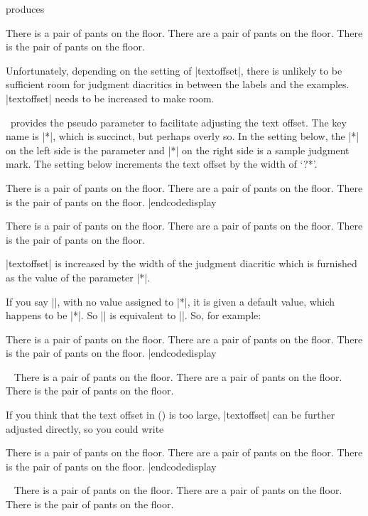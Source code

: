 \noindent produces

\framedisplay
\pex
\a There is a pair of pants on the floor.
\a {}There are a pair of pants on the floor.
\a \ljudge*There is the pair of pants on the floor.
\xe
\endframedisplay

\noindent Unfortunately, depending on the setting of
|textoffset|, there is unlikely to be sufficient room for
judgment diacritics in between the labels and the examples.
|textoffset| needs to be increased to make room.

\ExPex\ provides the pseudo parameter to facilitate adjusting the text
offset.  The key name is |*|, which is succinct, but perhaps overly
so.  In the setting below, the |*| on the left side is the parameter
and |*| on the right side is a sample judgment mark.  The setting
below increments the text offset by the width of `?*'.

\codedisplay
\pex[*=?*]
\a There is a pair of pants on the floor.
\a {}There are a pair of pants on the floor.
\a \ljudge*There is the pair of pants on the floor.
\xe |endcodedisplay

\framedisplay
\pex[*=?*]
\a There is a pair of pants on the floor.
\a {}There are a pair of pants on the floor.
\a \ljudge*There is the pair of pants on the floor.
\xe
\endframedisplay

\noindent |textoffset| is increased by the width of the judgment
diacritic which is furnished as the value of the parameter |*|.

If you say |\lingset{*}|, with no value assigned to |*|, it is
given a default value, which happens to be |*|.  So |\lingset{*}|
is equivalent to |\lingset{*=*}|.  So, for example:

\codedisplay
\pex[*]
\a There is a pair of pants on the floor.
\a \ljudge* There are a pair of pants on the floor.
\a \ljudge* There is the pair of pants on the floor.
\xe |endcodedisplay

\framedisplay~
\pex[*]
\a There is a pair of pants on the floor.
\a \ljudge* There are a pair of pants on the floor.
\a \ljudge* There is the pair of pants on the floor.
\xe
\endframedisplay

If you think that the text offset in (\blastx) is too large,
|textoffset| can be further adjusted directly, so you could write

\codedisplay
\pex[*=?*,textoffset=!-.3em]
\a There is a pair of pants on the floor.
\a {} There are a pair of pants on the floor.
\a \ljudge* There is the pair of pants on the floor.
\xe |endcodedisplay

\framedisplay~
\pex[*=?*,textoffset=!-.3em]
\a There is a pair of pants on the floor.
\a {} There are a pair of pants on the floor.
\a \ljudge* There is the pair of pants on the floor.
\xe
\endframedisplay


